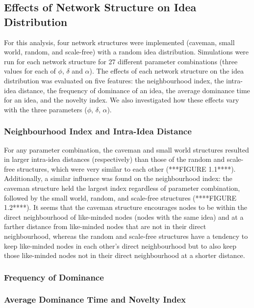 

\subsection{Effects of Network Structure on Idea Distribution}

For this analysis, four network structures were implemented (caveman, small world, random, and scale-free) with a random idea distribution. Simulations were run for each network structure for 27 different parameter combinations (three values for each of $\phi$, $\delta$ and $\alpha$). The effects of each network structure on the idea distribution was evaluated on five features: the neighbourhood index, the intra-idea distance, the frequency of dominance of an idea, the average dominance time for an idea, and the novelty index. We also investigated how these effects vary with the three parameters ($\phi$, $\delta$, $\alpha$).

\subsubsection{Neighbourhood Index and Intra-Idea Distance}

For any parameter combination, the caveman and small world structures resulted in larger intra-idea distances (respectively) than those of the random and scale-free structures, which were very similar to each other (***FIGURE 1.1****). Additionally, a similar influence was found on the neighbourhood index: the caveman structure held the largest index regardless of parameter combination, followed by the small world, random, and scale-free structures (****FIGURE 1.2****). It seems that the caveman structure encourages nodes to be within the direct neighbourhood of like-minded nodes (nodes with the same idea) and at a farther distance from like-minded nodes that are not in their direct neighbourhood, whereas the random and scale-free structures have a tendency to keep like-minded nodes in each other's direct neighbourhood but to also keep those like-minded nodes not in their direct neighbourhood at a shorter distance.

\subsubsection{Frequency of Dominance}

\subsubsection{Average Dominance Time and Novelty Index}


